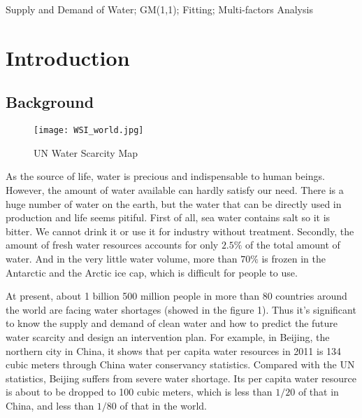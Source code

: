 \documentclass{mcmthesis}
\begin{document}
\begin{keywords}
Supply and Demand of Water; GM(1,1); Fitting; Multi-factors Analysis  
\end{keywords}

\maketitle
\tableofcontents
\newpage


\section{Introduction}
\subsection{Background} 
\begin{figure}[h]
\small
\centering
\texttt{[image: WSI\_world.jpg]}
\caption{UN Water Scarcity Map} \label{fig:UN water scarcity map}
\end{figure}
\par As the source of life, water is precious and indispensable to human beings. However, the amount of water available can hardly satisfy our need. There is a huge number of water on the earth, but the water that can be directly used in production and life seems pitiful. First of all, sea water contains salt so it is bitter. We cannot drink it or use it for industry without treatment. Secondly, the amount of fresh water resources accounts for only $2.5\%$ of the total amount of water. And in the very little water volume, more than $70\%$ is frozen in the Antarctic and the Arctic ice cap, which is difficult for people to use.
\par At present, about 1 billion 500 million people in more than 80 countries around the world are facing water shortages (showed in the figure 1). Thus it’s significant to know the supply and demand of clean water and how to predict the future water scarcity and design an intervention plan. For example, in Beijing, the northern city in China, it shows that per capita water resources in 2011 is 134 cubic meters through China water conservancy statistics. Compared with the UN statistics, Beijing suffers from severe water shortage. Its per capita water resource is about to be dropped to 100 cubic meters, which is less than $1/20$ of that in China, and less than $1/80$ of that in the world.
\end{document}
